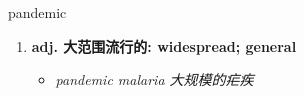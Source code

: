 
\begin{frame}
{\huge pandemic}
\begin{center}
\begin{enumerate}\Large
  \item \textbf{adj. 大范围流行的: widespread; general}
  \begin{itemize}
    \item \em{\Large{pandemic malaria 大规模的疟疾}}
  \end{itemize}
\end{enumerate}
\end{center}
\end{frame}

